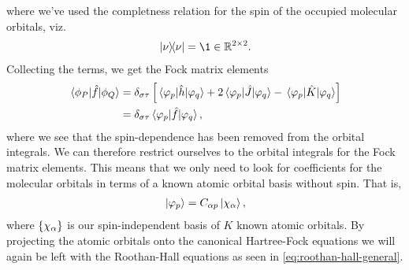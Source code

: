             where we've used the completness relation for the spin of the
            occupied molecular orbitals, viz.
            \begin{align}
                \dyad*{\nu}
                = \1 \in \mathbb{R}^{2 \times 2}.
            \end{align}
            Collecting the terms, we get the Fock matrix elements
            \begin{align}
                \mel*{\phi_P}{\hat{f}}{\phi_Q}
                &=
                \delta_{\sigma\tau}
                \left[ 
                    \mel*{\varphi_p}{\hat{h}}{\varphi_q}
                    +
                    2
                    \mel*{\varphi_p}{\hat{J}}{\varphi_q}
                    -
                    \mel*{\varphi_p}{\hat{K}}{\varphi_q}
                 \right]
                \\
                &=
                \delta_{\sigma\tau}
                \mel*{\varphi_p}{\hat{f}}{\varphi_q},
            \end{align}
            where we see that the spin-dependence has been removed from the
            orbital integrals.
            We can therefore restrict ourselves to the orbital integrals for the
            Fock matrix elements.
            This means that we only need to look for coefficients for the
            molecular orbitals in terms of a known atomic orbital basis without
            spin.
            That is,
            \begin{align}
                \ket*{\varphi_p} = C_{\alpha p} \ket*{\chi_{\alpha}},
            \end{align}
            where $\left\{ \chi_{\alpha} \right\}$ is our spin-independent basis of $K$
            known atomic orbitals.
            By projecting the atomic orbitals onto the canonical Hartree-Fock
            equations we will again be left with the Roothan-Hall equations as
            seen in \autoref{eq:roothan-hall-general}.


